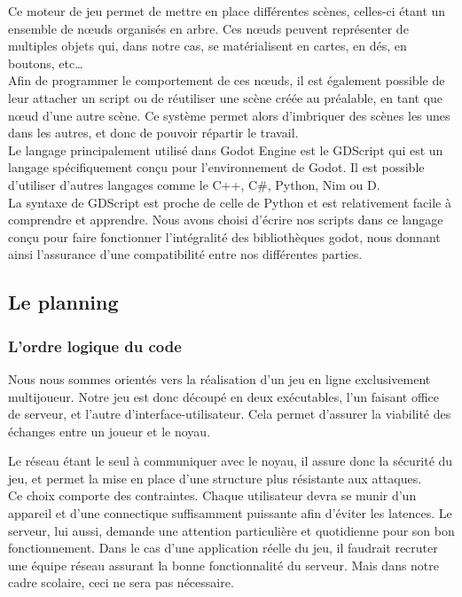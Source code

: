 \documentclass[a4paper,11pt]{article}
\begin{document}
    Ce moteur de jeu permet de mettre en place différentes scènes, celles-ci étant un ensemble de nœuds organisés en arbre. Ces nœuds peuvent représenter de multiples objets qui, dans notre cas, se matérialisent en cartes, en dés, en boutons, etc… \\

    Afin de programmer le comportement de ces nœuds, il est également possible de leur attacher un script ou de réutiliser une scène créée au préalable, en tant que nœud d’une autre scène. Ce système permet alors d’imbriquer des scènes les unes dans les autres, et donc de pouvoir répartir le travail. \\

    Le langage principalement utilisé dans Godot Engine est le GDScript  qui est un langage spécifiquement conçu pour l’environnement de Godot. Il est possible d’utiliser d’autres langages comme le C++, C\#, Python, Nim ou D. \\
 
    La syntaxe de GDScript est proche de celle de Python et est relativement facile à comprendre et apprendre. Nous avons choisi d’écrire nos scripts dans ce langage conçu pour faire fonctionner l’intégralité des bibliothèques godot, nous donnant ainsi l’assurance d’une compatibilité entre nos différentes parties. 


\subsection{Le planning}
\subsubsection{L'ordre logique du code}

    Nous nous sommes orientés vers la réalisation d’un jeu en ligne exclusivement multijoueur. Notre jeu est donc découpé en deux exécutables, l’un faisant office de serveur, et l’autre d’interface-utilisateur. Cela permet d’assurer la viabilité des échanges entre un joueur et le noyau. 

\newpage

    Le réseau étant le seul à communiquer avec le noyau, il assure donc la sécurité du jeu, et permet la mise en place d’une structure plus résistante aux attaques. \\

    Ce choix comporte des contraintes. Chaque utilisateur devra se munir d’un appareil et d’une connectique suffisamment puissante afin d’éviter les latences. Le serveur, lui aussi, demande une attention particulière et quotidienne pour son bon fonctionnement. Dans le cas d’une application réelle du jeu, il faudrait recruter une équipe réseau assurant la bonne fonctionnalité du serveur. Mais dans notre cadre scolaire, ceci ne sera pas nécessaire.  \\
\end{document}
